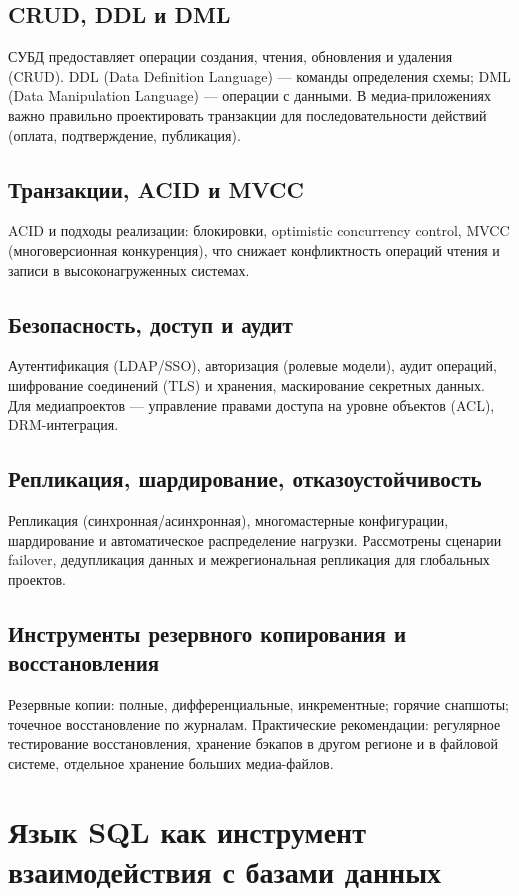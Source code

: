 \documentclass[14pt,a4paper]{extarticle}
\begin{document}
\subsection{CRUD, DDL и DML}
СУБД предоставляет операции создания, чтения, обновления и удаления (CRUD). DDL (Data Definition Language) — команды определения схемы; DML (Data Manipulation Language) — операции с данными. В медиа-приложениях важно правильно проектировать транзакции для последовательности действий (оплата, подтверждение, публикация).

\subsection{Транзакции, ACID и MVCC}
ACID и подходы реализации: блокировки, optimistic concurrency control, MVCC (многоверсионная конкуренция), что снижает конфликтность операций чтения и записи в высоконагруженных системах.

\subsection{Безопасность, доступ и аудит}
Аутентификация (LDAP/SSO), авторизация (ролевые модели), аудит операций, шифрование соединений (TLS) и хранения, маскирование секретных данных. Для медиапроектов — управление правами доступа на уровне объектов (ACL), DRM-интеграция.

\subsection{Репликация, шардирование, отказоустойчивость}
Репликация (синхронная/асинхронная), многомастерные конфигурации, шардирование и автоматическое распределение нагрузки. Рассмотрены сценарии failover, дедупликация данных и межрегиональная репликация для глобальных проектов.

\subsection{Инструменты резервного копирования и восстановления}
Резервные копии: полные, дифференциальные, инкрементные; горячие снапшоты; точечное восстановление по журналам. Практические рекомендации: регулярное тестирование восстановления, хранение бэкапов в другом регионе и в файловой системе, отдельное хранение больших медиа-файлов.

\section{Язык SQL как инструмент взаимодействия с базами данных}
\end{document}

